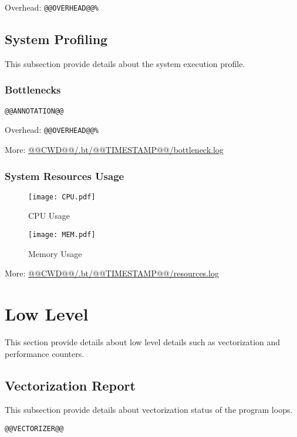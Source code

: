 \documentclass[a4paper]{article}
\begin{document}
Overhead: {\tt @@OVERHEAD@@\%}

\subsection{System Profiling}

This subsection provide details about the system execution profile.

\subsubsection{Bottlenecks}

\begin{verbatim}
@@ANNOTATION@@
\end{verbatim}

Overhead: {\tt @@OVERHEAD@@\%}

More: \url{@@CWD@@/.bt/@@TIMESTAMP@@/bottleneck.log}

\subsubsection{System Resources Usage}

\begin{figure}[H]
\label{fig:normal}
\centering
\texttt{[image: CPU.pdf]}
\caption{CPU Usage}
\end{figure}

\begin{figure}[H]
\label{fig:normal}
\centering
\texttt{[image: MEM.pdf]}
\caption{Memory Usage}
\end{figure}

More: \url{@@CWD@@/.bt/@@TIMESTAMP@@/resources.log}

\section{Low Level}

This section provide details about low level details such as vectorization and performance counters.

\subsection{Vectorization Report}

This subsection provide details about vectorization status of the program loops.

\begin{verbatim}
@@VECTORIZER@@
\end{verbatim}
\end{document}
